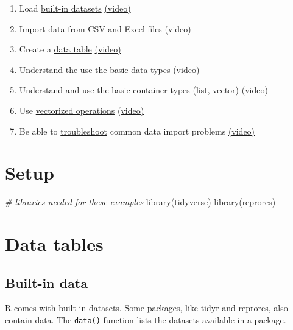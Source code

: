 \documentclass[
  oneside]{book}
\newenvironment{Shaded}{\begin{snugshade}}{\end{snugshade}}
\newcommand{\CommentTok}[1]{\textcolor[rgb]{0.56,0.35,0.01}{\textit{#1}}}
\newcommand{\FunctionTok}[1]{\textcolor[rgb]{0.00,0.00,0.00}{#1}}
\newcommand{\NormalTok}[1]{#1}
\providecommand{\tightlist}{%
  \setlength{\itemsep}{0pt}\setlength{\parskip}{0pt}}
\begin{document}
\begin{enumerate}
\def\labelenumi{\arabic{enumi}.}
\tightlist
\item
  Load \protect\hyperlink{builtin}{built-in datasets} \href{https://youtu.be/Z5fK5VGmzlY}{(video)}
\item
  \protect\hyperlink{import_data}{Import data} from CSV and Excel files \href{https://youtu.be/a7Ra-hnB8l8}{(video)}
\item
  Create a \protect\hyperlink{tables-data}{data table} \href{https://youtu.be/k-aqhurepb4}{(video)}
\item
  Understand the use the \protect\hyperlink{data_types}{basic data types} \href{https://youtu.be/jXQrF18Jaac}{(video)}
\item
  Understand and use the \protect\hyperlink{containers}{basic container types} (list, vector) \href{https://youtu.be/4xU7uKNdoig}{(video)}
\item
  Use \protect\hyperlink{vectorized_ops}{vectorized operations} \href{https://youtu.be/9I5MdS7UWmI}{(video)}
\item
  Be able to \protect\hyperlink{Troubleshooting}{troubleshoot} common data import problems \href{https://youtu.be/gcxn4LJ_vAI}{(video)}
\end{enumerate}

\hypertarget{setup-data}{%
\section{Setup}\label{setup-data}}

\begin{Shaded}
\begin{Highlighting}[]
\CommentTok{\# libraries needed for these examples}
\FunctionTok{library}\NormalTok{(tidyverse)}
\FunctionTok{library}\NormalTok{(reprores)}
\end{Highlighting}
\end{Shaded}

\hypertarget{data-tables}{%
\section{Data tables}\label{data-tables}}

\hypertarget{builtin}{%
\subsection{Built-in data}\label{builtin}}

R comes with built-in datasets. Some packages, like tidyr and reprores, also contain data. The \texttt{data()} function lists the datasets available in a package.
\end{document}
